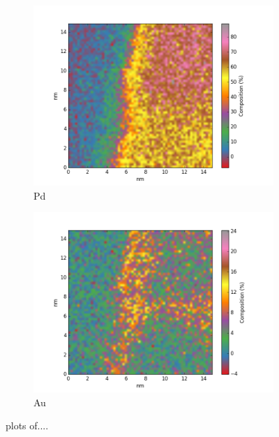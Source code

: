 \begin{figure}
\begin{subfigure}{0.45\textwidth}
		\includegraphics[width=\textwidth]{fig/q-new/E/oldzeta/Pd_zeta}
		\caption{Pd}
		\label{fig:Epd}
	\end{subfigure}%
\hfill
	\begin{subfigure}{0.45\textwidth}
		\includegraphics[width=\textwidth]{fig/q-new/E/oldzeta-Au/Au_zeta}
		\caption{Au}
		\label{fig:Eau}
	\end{subfigure}
	\caption{plots of....}
	\label{fig:E}
\end{figure}

